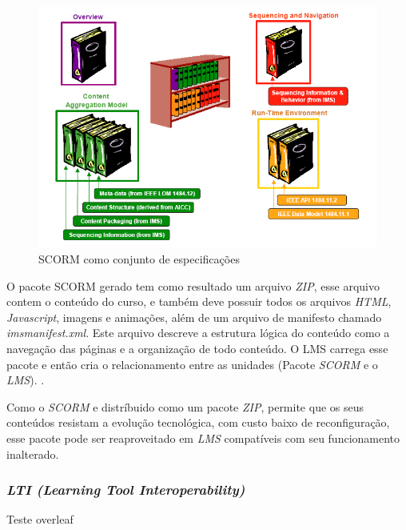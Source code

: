 \begin{figure}[h]
  \centering
  \label{fig:scorm-funcionamento-dutra}
  \includegraphics[keepaspectratio=true,scale=0.6]{figuras/scorm-funcionamento-dutra.png}
  \caption{SCORM como conjunto de especificações }
\end{figure}
\par
O pacote \ac{SCORM} gerado tem como resultado um arquivo \textit{ZIP}, esse arquivo contem o conteúdo do curso, e também deve possuir todos os arquivos \textit{HTML}, \textit{Javascript}, imagens e animações, além de um arquivo de manifesto chamado \textit{imsmanifest.xml}. Este arquivo descreve a estrutura lógica do conteúdo como a navegação das páginas e a organização de todo conteúdo. O \ac{LMS} carrega esse pacote e então cria o relacionamento entre as unidades (Pacote \textit{SCORM} e o \textit{LMS}). \cite[p.~39]{fernandes-scorm}.
\par
Como o \textit{SCORM} e distríbuido como um pacote \textit{ZIP}, permite que os seus conteúdos resistam a evolução tecnológica, com custo baixo de reconfiguração, esse pacote pode ser reaproveitado em \textit{LMS} compatíveis com seu funcionamento inalterado.

\subsubsection{\textit{LTI (Learning Tool Interoperability)}}
Teste overleaf
